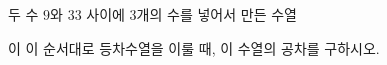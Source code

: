 두 수 $9$와 $33$ 사이에 3개의 수를 넣어서 만든 수열\par\smallskip{}\par\smallskip\noindent 이 이 순서대로 등차수열을 이룰 때, 이 수열의 공차를 구하시오.
